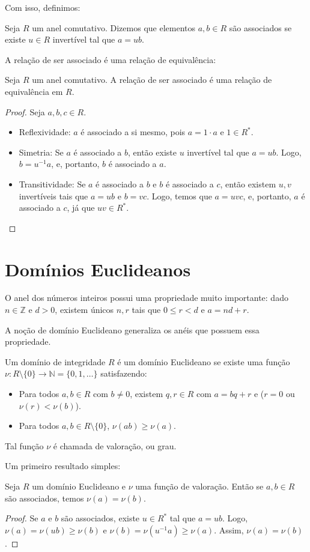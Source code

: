 Com isso, definimos:

\begin{definition}
Seja $R$ um anel comutativo.
Dizemos que elementos $a, b \in R$ são associados se existe $u \in R$ invertível tal que $a=ub$.
\end{definition}

A relação de ser associado é uma relação de equivalência:

\begin{lemma}
    Seja $R$ um anel comutativo. A relação de ser associado é uma relação de equivalência em $R$.
\end{lemma}
\begin{proof}
    Seja $a, b, c \in R$.
    \begin{itemize}
        \item Reflexividade: $a$ é associado a si mesmo, pois $a=1\cdot a$ e $1 \in R^*$.
        \item Simetria: Se $a$ é associado a $b$, então existe $u$ invertível tal que $a=ub$. Logo, $b=u^{-1}a$, e, portanto, $b$ é associado a $a$.
        \item Transitividade: Se $a$ é associado a $b$ e $b$ é associado a $c$, então existem $u, v$ invertíveis tais que $a=ub$ e $b=vc$.
        Logo, temos que $a=uvc$, e, portanto, $a$ é associado a $c$, já que $uv\in R^*$.
    \end{itemize}
\end{proof}
\section{Domínios Euclideanos}
O anel dos números inteiros possui uma propriedade muito importante:
dado $n\in \mathbb Z$ e $d>0$, existem únicos $n, r$ tais que $0\leq r < d$ e $a=nd+r$.

A noção de domínio Euclideano generaliza os anéis que possuem essa propriedade.

\begin{definition}
    Um domínio de integridade $R$ é um domínio Euclideano
    se existe uma função $\nu:R\setminus \{0\} \to \mathbb N=\{0, 1, \dots\}$ satisfazendo:
    \begin{itemize}
        \item Para todos $a, b \in R$ com $b\neq 0$, existem $q, r \in R$ com $a=bq+r$ e ($r=0$ ou $\nu(r)<\nu(b)$).
        \item Para todos $a, b \in R\setminus \{0\}$, $\nu(ab)\geq \nu(a)$.
    \end{itemize}

    Tal função $\nu$ é chamada de valoração, ou grau.
\end{definition}
Um primeiro resultado simples:
\begin{definition}
    Seja $R$ um domínio Euclideano e $\nu$ uma função de valoração.
    Então se $a, b \in R$ são associados, temos $\nu(a)=\nu(b)$.
\end{definition}
\begin{proof}
    Se $a$ e $b$ são associados, existe $u \in R^*$ tal que $a=ub$.
    Logo, $\nu(a)=\nu(ub)\geq \nu(b)$ e $\nu(b)=\nu(u^{-1}a)\geq \nu(a)$.
    Assim, $\nu(a)=\nu(b)$.
\end{proof}

